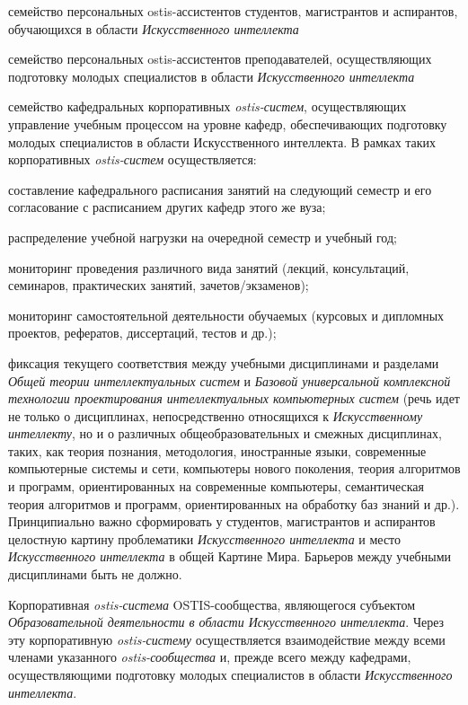 \begin{scnsubstruct}
{\begin{scnitemize}
            \item семейство персональных ostis-ассистентов студентов, магистрантов и аспирантов, обучающихся в области \textit{Искусственного интеллекта}
            \item семейство персональных ostis-ассистентов преподавателей, осуществляющих подготовку молодых специалистов в области \textit{Искусственного интеллекта}
            \item семейство кафедральных корпоративных \textit{ostis-систем}, осуществляющих управление учебным процессом на уровне кафедр, обеспечивающих подготовку молодых специалистов в области Искусственного интеллекта. В рамках таких корпоративных \textit{ostis-систем} осуществляется:
            \begin{scnitemizeii}
                \item составление кафедрального расписания занятий на следующий семестр и его согласование с расписанием других кафедр этого же вуза;
                \item распределение учебной нагрузки на очередной семестр и учебный год;
                \item мониторинг проведения различного вида занятий (лекций, консультаций, семинаров, практических занятий, зачетов/экзаменов);
                \item мониторинг самостоятельной деятельности обучаемых (курсовых и дипломных проектов, рефератов, диссертаций, тестов и др.);
                \item фиксация текущего соответствия между учебными дисциплинами и разделами \textit{Общей теории интеллектуальных систем} и \textit{Базовой универсальной комплексной технологии проектирования интеллектуальных компьютерных систем} (речь идет не только о дисциплинах, непосредственно относящихся к \textit{Искусственному интеллекту}, но и о различных общеобразовательных и смежных дисциплинах, таких, как теория познания, методология, иностранные языки, современные компьютерные системы и сети, компьютеры нового поколения, теория алгоритмов и программ, ориентированных на современные компьютеры, семантическая теория алгоритмов и программ, ориентированных на обработку баз знаний и др.). Принципиально важно сформировать у студентов, магистрантов и аспирантов целостную картину проблематики \textit{Искусственного интеллекта} и место \textit{Искусственного интеллекта} в общей Картине Мира. Барьеров между учебными дисциплинами быть не должно.
            \end{scnitemizeii}
            \item Корпоративная \textit{ostis-система} OSTIS-сообщества, являющегося субъектом \textit{Образовательной деятельности в области Искусственного интеллекта}. Через эту корпоративную \textit{ostis-систему} осуществляется взаимодействие между всеми членами указанного \textit{\mbox{ostis-сообщества}} и, прежде всего между кафедрами, осуществляющими подготовку молодых специалистов в области \textit{Искусственного интеллекта}.

\end{scnitemize}}
\end{scnsubstruct}
